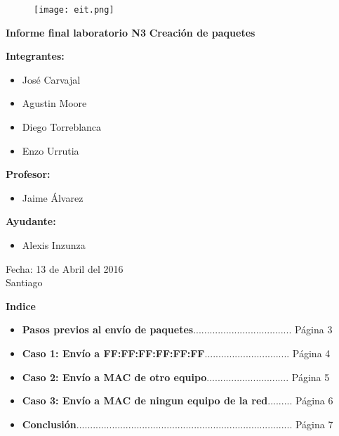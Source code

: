\documentclass{article}
\begin{document}
\begin{figure}
\centering
\texttt{[image: eit.png]}
\end{figure}
\begin{center}
{\large \rm \textbf {Informe final laboratorio N3} \linebreak}
\baselineskip 40pt
{\LARGE \bfseries Creación de paquetes }
\end{center}
\vspace*{2cm}
\textbf{Integrantes:}
\begin{itemize}
\item José Carvajal
\item Agustin Moore
\item Diego Torreblanca
\item Enzo Urrutia
\end{itemize}
\baselineskip 20pt
\textbf{Profesor:}
\begin{itemize}
\item Jaime Álvarez
\end{itemize}
\baselineskip 20pt
\textbf{Ayudante:}
\begin{itemize}
\item Alexis Inzunza
\end{itemize}
\vspace*{0.5cm}
\begin{flushleft}
Fecha: 13 de Abril del 2016\\
Santiago
\end{flushleft}
\newpage
\begin{center}
{\LARGE \bfseries Indice}
\end{center}
\vspace*{0.5cm}
\begin{itemize}
\item \textbf{Pasos previos al envío de paquetes}.................................... Página 3\\
\item \textbf{Caso 1: Envío a FF:FF:FF:FF:FF:FF}............................... Página 4\\
\item \textbf{Caso 2: Envío a MAC de otro equipo}.............................. Página 5 \\
\item \textbf{Caso 3: Envío a MAC de ningun equipo de la red}......... Página 6 \\
\item \textbf{Conclusión}............................................................................... Página 7\\
\end{itemize}
\end{document}
